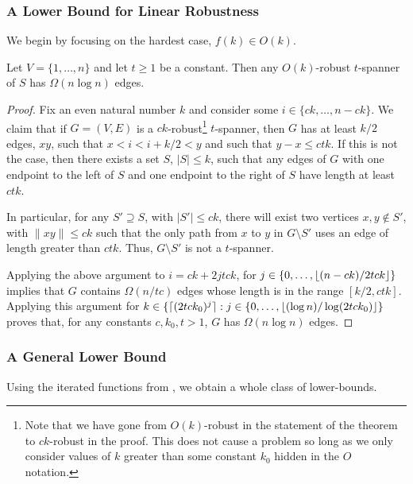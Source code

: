 \documentclass{patmorin}
\begin{document}
\subsubsection{A Lower Bound for Linear Robustness}

We begin by focusing on the hardest case, $f(k) \in O(k)$.

\begin{thm}
  Let $V=\{1,\ldots,n\}$ and let $t\ge 1$ be a constant.  Then any
  $O(k)$-robust $t$-spanner of $S$ has $\Omega(n\log n)$ edges.
\end{thm}

\begin{proof}
  Fix an even natural number $k$ and consider some
  $i\in\{ck,\ldots,n-ck\}$.  We claim that if $G=(V,E)$ is a
  $ck$-robust\footnote{Note that we have gone from $O(k)$-robust in the
  statement of the theorem to $ck$-robust in the proof.  This does not
  cause a problem so long as we only consider values of $k$ greater
  than some constant $k_0$ hidden in the $O$ notation.} $t$-spanner,
  then $G$ has at least $k/2$ edges, $xy$, such that $x < i < i+k/2 <
  y$ and such that $y-x \le ctk$.  If this is not the case, then there
  exists a set $S$, $|S|\le k$, such that any edges of $G$ with one
  endpoint to the left of $S$ and one endpoint to the right of $S$
  have length at least $ctk$.

  In particular, for any $S'\supseteq S$, with $|S'|\le ck$, there will
  exist two vertices $x,y\not\in S'$, with $\|xy\|\le ck$ such that the
  only path from $x$ to $y$ in $G\setminus S'$ uses an edge of length
  greater than $ctk$.  Thus, $G\setminus S'$ is not a $t$-spanner.

  Applying the above argument to $i=ck+2jtck$, for
  $j\in\{0,\ldots,{\lfloor (n-ck)/2tck \rfloor}\}$ implies that $G$ contains
  $\Omega(n/tc)$ edges whose length is in the range $[k/2,ctk]$.
  Applying this argument for $k\in\{{\lceil (2tck_0)^{j} \rceil} :
  j\in\{0,\ldots,{\lfloor (\log n)/\log(2tck_0) \rfloor}\}$ proves that, for any
  constants $c,k_0,t>1$, $G$ has $\Omega(n\log n)$ edges.
\end{proof}


\subsubsection{A General Lower Bound}

Using the iterated functions from , we obtain a whole
class of lower-bounds.
\end{document}
